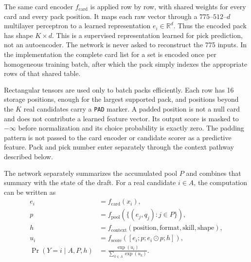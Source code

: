 \documentclass[11pt]{article}
\numberwithin{equation}{section}
\begin{document}
The same card encoder $f_{\mathrm{card}}$ is applied row by row, with shared
weights for every card and every pack position. It maps each raw vector through
a $775$--$512$--$d$ multilayer perceptron to a learned representation
$e_i\in\mathbb{R}^d$. Thus the encoded pack has shape $K\times d$. This is a
supervised representation learned for pick prediction, not an autoencoder.
The network is never asked to reconstruct the 775 inputs. In the implementation
the complete card list for a set is encoded once per homogeneous training
batch, after which the pack simply indexes the appropriate rows of that shared
table.

Rectangular tensors are used only to batch packs efficiently. Each row has 16
storage positions, enough for the largest supported pack, and positions beyond
the $K$ real candidates carry a \texttt{PAD} marker. A padded position is not a
null card and does not contribute a learned feature vector. Its output score is
masked to $-\infty$ before normalization and its choice probability is exactly
zero. The padding pattern is not passed to the card encoder or candidate scorer
as a predictive feature. Pack and pick number enter separately through the
context pathway described below.

The network separately summarizes the accumulated pool $P$ and combines that
summary with the state of the draft. For a real candidate $i\in A$, the
computation can be written as
\begin{align}
e_i &= f_{\mathrm{card}}(x_i), \\
p &= f_{\mathrm{pool}}\left(\{(e_j,q_j):j\in P\}\right), \\
h &= f_{\mathrm{context}}(\text{position},\text{format},\text{skill},
\text{shape}), \\
u_i &= f_{\mathrm{score}}([e_i;p;e_i\odot p;h]), \\
\Pr(Y=i\mid A,P,h) &= \frac{\exp(u_i)}{\sum_{k\in A}\exp(u_k)}.
\end{align}
\end{document}
